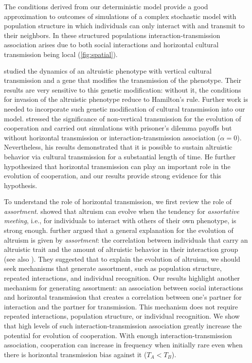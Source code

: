 \documentclass[12pt]{extarticle}
\begin{document}
The conditions derived from our deterministic model provide a good approximation to outcomes of simulations of a complex stochastic model with population structure in which individuals can only interact with and transmit to their neighbors.
In these structured populations interaction-transmission association arises due to both social interactions and horizontal cultural transmission being local (\autoref{fig:spatial}).

\citet{feldman1985gene} studied the dynamics of an altruistic phenotype with vertical cultural transmission and a gene that modifies the transmission of the phenotype. Their results are very sensitive to this genetic modification: without it, the conditions for invasion of the altruistic phenotype reduce to Hamilton's rule.
Further work is needed to incorporate such genetic modification of cultural transmission into our model.
\citet{woodcock2006significance} stressed the significance of non-vertical transmission for the evolution of cooperation and
carried out simulations with prisoner's dilemma payoffs but without horizontal transmission or interaction-transmission association ($\alpha=0$).
Nevertheless, his results demonstrated that it is possible to sustain altruistic behavior via cultural transmission for a substantial length of time.
He further hypothesized that horizontal transmission can play an important role in the evolution of cooperation, and our results provide strong evidence for this hypothesis. 

To understand the role of horizontal transmission, we first review the role of \emph{assortment}.
\citet{Eshel1982} showed that altruism can evolve when the tendency for \emph{assortative meeting}, i.e., for individuals to interact with others of their own phenotype, is strong enough.
\citet{Fletcher2009assortment}  further argued that a general explanation for the evolution of altruism is given by \emph{assortment}: the correlation between individuals that carry an altruistic trait and the amount of altruistic behavior in their interaction group (see also \citet{Bijma2010assortment}).
They suggested that to explain the evolution of altruism, we should seek mechanisms that generate  assortment, such as population structure, repeated interactions, and individual recognition.
Our results highlight another mechanism for generating assortment: an association between social interactions and horizontal transmission that creates a correlation between one's partner for interaction and the partner for transmission.
This mechanism does not require repeated interactions, population structure, or individual recognition.
We show that high levels of such interaction-transmission association greatly increase the potential for evolution of cooperation.
With enough interaction-transmission association, cooperation can increase in frequency when initially rare even when there is horizontal transmission bias against it ($T_A<T_B$).
\end{document}
